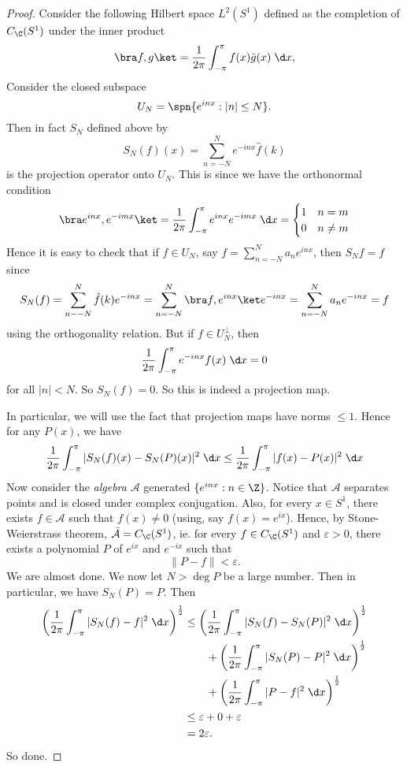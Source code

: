 \documentclass[a4paper]{article}
\begin{document}
\begin{proof}
  Consider the following Hilbert space $L^2(S^1)$ defined as the completion of $C_{\C}(S^1)$ under the inner product
  \[
    \bra f, g\ket = \frac{1}{2\pi} \int_{-\pi}^\pi f(x) \bar{g}(x) \;\d x,
  \]
  Consider the closed subspace
  \[
    U_N = \spn \{e^{inx}: |n| \leq N\}.
  \]
  Then in fact $S_N$ defined above by
  \[
    S_N(f)(x) = \sum_{n = -N}^N e^{-inx} \hat{f}(k)
  \]
  is the projection operator onto $U_N$. This is since we have the orthonormal condition
  \[
    \bra e^{inx}, e^{-imx}\ket = \frac{1}{2\pi} \int_{-\pi}^\pi e^{inx}e^{-imx}\;\d x =
    \begin{cases}
      1 & n = m\\
      0 & n \not= m
    \end{cases}
  \]
  Hence it is easy to check that if $f \in U_N$, say $f = \sum_{n = -N}^N a_n e^{inx}$, then $S_N f = f$ since
  \[
    S_N (f) = \sum_{n - -N}^N \hat{f}(k) e^{-inx} = \sum_{n = -N}^N \bra f, e^{inx}\ket e^{-inx} = \sum_{n = -N}^N a_n e^{-inx} = f
  \]
  using the orthogonality relation. But if $f \in U_N^\perp$, then
  \[
    \frac{1}{2\pi} \int_{-\pi}^\pi e^{-inx} f(x)\;\d x = 0
  \]
  for all $|n| < N$. So $S_N(f) = 0$. So this is indeed a projection map.

  In particular, we will use the fact that projection maps have norms $\leq 1$. Hence for any $P(x)$, we have
  \[
    \frac{1}{2\pi}\int_{-\pi}^\pi |S_N(f)(x) - S_N(P)(x)|^2 \;\d x \leq \frac{1}{2\pi} \int_{-\pi}^\pi |f(x) - P(x)|^2 \;\d x
  \]
  Now consider the \emph{algebra} $\mathcal{A}$ generated $\{e^{inx}: n \in \Z\}$. Notice that $\mathcal{A}$ separates points and is closed under complex conjugation. Also, for every $x \in S^1$, there exists $f \in \mathcal{A}$ such that $f(x) \not= 0$ (using, say $f(x) = e^{ix}$). Hence, by Stone-Weierstrass theorem, $\bar{\mathcal{A}} = C_\C(S^1)$, ie. for every $f \in C_\C (S^1)$ and $\varepsilon > 0$, there exists a polynomial $P$ of $e^{ix}$ and $e^{-ix}$ such that
  \[
    \|P - f\| < \varepsilon.
  \]
  We are almost done. We now let $N > \deg P$ be a large number. Then in particular, we have $S_N(P) = P$. Then
  \begin{align*}
    \left(\frac{1}{2\pi} \int_{-\pi}^\pi |S_N(f) - f|^2 \;\d x\right)^{\frac{1}{2}} &\leq \left(\frac{1}{2\pi}\int_{-\pi}^\pi |S_N(f) - S_N(P)|^2 \;\d x\right)^{\frac{1}{2}} \\
    &\quad \quad+ \left(\frac{1}{2\pi} \int_{-\pi}^\pi |S_N(P) - P|^2 \;\d x\right)^{\frac{1}{2}}\\
    &\quad \quad+ \left(\frac{1}{2\pi} \int_{-\pi}^\pi |P - f|^2 \;\d x\right)^{\frac{1}{2}}\\
    &\leq \varepsilon + 0 + \varepsilon\\
    &= 2\varepsilon.
  \end{align*}
  So done.
\end{proof}
\end{document}
